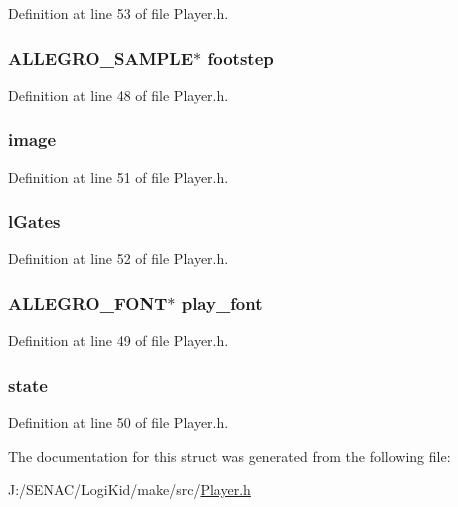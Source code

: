 Definition at line 53 of file Player.\-h.

\hypertarget{struct_player_aa7228d2fb7ab3cc3b4d35e4779a4d4c2}{
\subsubsection[{footstep}]{\setlength{\rightskip}{0pt plus 5cm}A\-L\-L\-E\-G\-R\-O\-\_\-\-S\-A\-M\-P\-L\-E$\ast$ footstep}}\label{struct_player_aa7228d2fb7ab3cc3b4d35e4779a4d4c2}


Definition at line 48 of file Player.\-h.

\hypertarget{struct_player_af6057c173c211ff78c0f66fe3229899e}{
\subsubsection[{image}]{ image}}\label{struct_player_af6057c173c211ff78c0f66fe3229899e}


Definition at line 51 of file Player.\-h.

\hypertarget{struct_player_ac73f56fdd711a88a042bdb7bb6279b56}{
\subsubsection[{l\-Gates}]{ l\-Gates}}\label{struct_player_ac73f56fdd711a88a042bdb7bb6279b56}


Definition at line 52 of file Player.\-h.

\hypertarget{struct_player_a7ecd1e530b0530077cb42a66baa5c469}{
\subsubsection[{play\-\_\-font}]{\setlength{\rightskip}{0pt plus 5cm}A\-L\-L\-E\-G\-R\-O\-\_\-\-F\-O\-N\-T$\ast$ play\-\_\-font}}\label{struct_player_a7ecd1e530b0530077cb42a66baa5c469}


Definition at line 49 of file Player.\-h.

\hypertarget{struct_player_a876b486d3a5241a126bd5751c5f70f79}{
\subsubsection[{state}]{ state}}\label{struct_player_a876b486d3a5241a126bd5751c5f70f79}


Definition at line 50 of file Player.\-h.



The documentation for this struct was generated from the following file\-:\begin{DoxyCompactItemize}
\item 
J\-:/\-S\-E\-N\-A\-C/\-Logi\-Kid/make/src/\hyperlink{_player_8h}{Player.\-h}\end{DoxyCompactItemize}
